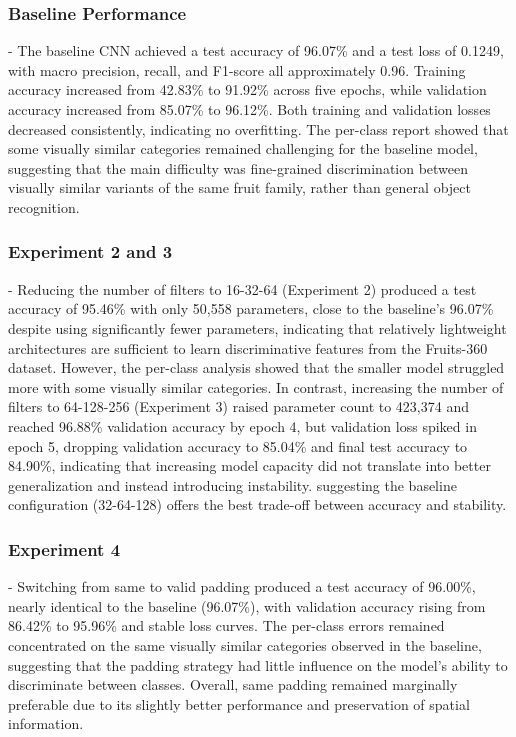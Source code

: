 \documentclass[conference]{IEEEtran}
\begin{document}
\subsubsection{Baseline Performance} - The baseline CNN achieved a test accuracy of 96.07\% and a test loss of 0.1249, with macro precision, recall, and F1-score all approximately 0.96. Training accuracy increased from 42.83\% to 91.92\% across five epochs, while validation accuracy increased from 85.07\% to 96.12\%. Both training and validation losses decreased consistently, indicating no overfitting. The per-class report showed that some visually similar categories remained challenging for the baseline model, suggesting that the main difficulty was fine-grained discrimination between visually similar variants of the same fruit family, rather than general object recognition.

\subsubsection{Experiment 2 and 3} - Reducing the number of filters to 16-32-64 (Experiment 2) produced a test accuracy of 95.46\% with only 50,558 parameters, close to the baseline's 96.07\% despite using significantly fewer parameters, indicating that relatively lightweight architectures are sufficient to learn discriminative features from the Fruits-360 dataset. However, the per-class analysis showed that the smaller model struggled more with some visually similar categories.
In contrast, increasing the number of filters to 64-128-256 (Experiment 3) raised parameter count to 423,374 and reached 96.88\% validation accuracy by epoch 4, but validation loss spiked in epoch 5, dropping validation accuracy to 85.04\% and final test accuracy to 84.90\%, indicating that increasing model capacity did not translate into better generalization and instead introducing instability. suggesting the baseline configuration (32-64-128) offers the best trade-off between accuracy and stability.

\subsubsection{Experiment 4} - Switching from same to valid padding produced a test accuracy of 96.00\%, nearly identical to the baseline (96.07\%), with validation accuracy rising from 86.42\% to 95.96\% and stable loss curves. The per-class errors remained concentrated on the same visually similar categories observed in the baseline, suggesting that the padding strategy had little influence on the model's ability to discriminate between classes. Overall, same padding remained marginally preferable due to its slightly better performance and preservation of spatial information.
\end{document}
